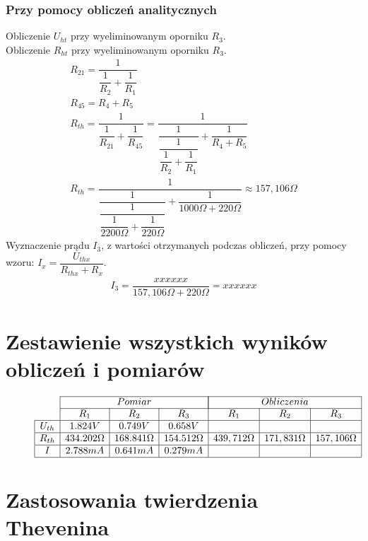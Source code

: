 \documentclass[polish,polish,a4paper]{article}
\begin{document}
\begin{spacing}{2}
	\subsubsection{Przy pomocy obliczeń analitycznych}
	Obliczenie $U_{ht}$ przy wyeliminowanym oporniku $ R_{3} $.\\
		Obliczenie $R_{ht}$ przy wyeliminowanym oporniku $ R_{3} $.
	\begin{gather*}
	R_{21} = \dfrac{1}{\dfrac{1}{R_{2}} + \dfrac{1}{R_{1}}}\\
	R_{45} = R_{4} + R_{5}\\
	R_{th} = \dfrac{1}{\dfrac{1}{R_{21}} + \dfrac{1}{R_{45}}} = \dfrac{1}{\dfrac{1}{\dfrac{1}{\dfrac{1}{R_{2}} + \dfrac{1}{R_{1}}}} + \dfrac{1}{R_{4} + R_{5}}}\\
	R_{th} = \dfrac{1}{\dfrac{1}{\dfrac{1}{\dfrac{1}{2200\Omega} + \dfrac{1}{220\Omega}}} + \dfrac{1}{1000\Omega + 220\Omega}} \approx 157,106\Omega
	\end{gather*}
		Wyznaczenie prądu $I_{3}$, z wartości otrzymanych podczas obliczeń, przy pomocy wzoru: $I_{x}= \dfrac{U_{thx}}{R_{thx} + R_{x}}$.
	\begin{gather*}
	I_{3}=\dfrac{xxxxxx}{157,106\Omega + 220\Omega } = xxxxxx
	\end{gather*}
	\section{Zestawienie wszystkich wyników obliczeń i pomiarów}
		\begin{figure}[H]
			\begin{equation*}
			\begin{array}{|c|c|c|c|c|c|c|}
				\cline{2-7}
				\multicolumn{1}{c}{}&\multicolumn{3}{|c|}{Pomiar}&\multicolumn{3}{|c|}{Obliczenia}\\
				\cline{2-7}
				\multicolumn{1}{c|}{}&R_{1}&R_{2}&R_{3}&R_{1}&R_{2}&R_{3}\\
				\hline
				U_{th}&1.824V&0.749V&0.658V&&&\\
				\hline
				R_{th}&434.202\Omega&168.841\Omega&154.512\Omega&439,712\Omega&171,831\Omega&157,106\Omega\\
				\hline
				I&2.788mA&0.641mA&0.279mA&&&\\
				\hline
				
			\end{array}
			\end{equation*}
		\end{figure}
	\section{Zastosowania twierdzenia Thevenina}
	
		\newpage
		
	\tableofcontents
		
	\end{spacing}
\end{document}
